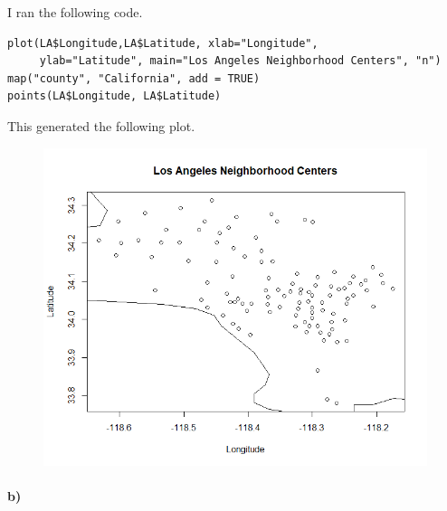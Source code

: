 \documentclass[12pt]{article}
\begin{document}
I ran the following code.
\scriptsize
\begin{verbatim}
plot(LA$Longitude,LA$Latitude, xlab="Longitude",
     ylab="Latitude", main="Los Angeles Neighborhood Centers", "n")
map("county", "California", add = TRUE)
points(LA$Longitude, LA$Latitude)
\end{verbatim}
\normalsize
This generated the following plot.
\begin{figure}[H]
    \begin{center}
        \includegraphics[width=4.5in]{exercise4a.png}
    \end{center}
\end{figure}

\paragraph{b)}
\end{document}
